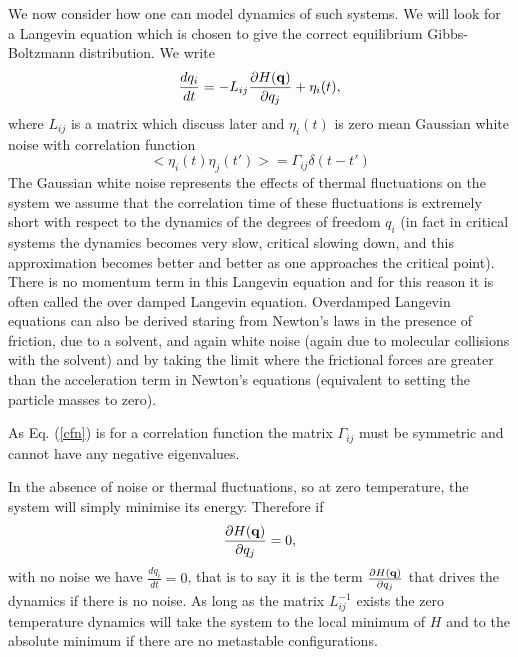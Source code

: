 We now consider how one can model dynamics of such systems. We will look for a Langevin equation which is chosen to give the correct equilibrium Gibbs-Boltzmann distribution. We write
\begin{equation}
    \frac{d q_i}{dt} = -L_{ij}\frac{\partial H({\bf q})}{ \partial q_j} + \eta_i(t),
\end{equation}
where $L_{ij}$ is a matrix which discuss later and $\eta_i(t)$ is zero mean Gaussian white noise  with correlation function 
\begin{equation}
    < \eta_i(t)\eta_j(t')> =  \Gamma_{ij} \delta(t-t')\label{cfn}
\end{equation}
The Gaussian white noise represents the effects of thermal fluctuations on the system we assume that the correlation time of these fluctuations is extremely short with respect to the dynamics of the degrees of freedom $q_i$ (in fact in critical systems the dynamics becomes very slow, critical slowing down, and this approximation becomes better and better as one approaches the critical point).  There is no momentum term in this Langevin equation and for this reason it is often called the over damped Langevin equation. Overdamped Langevin equations can also be derived staring from Newton's laws in the presence of friction, due to a solvent, and again white noise (again due to molecular collisions with the solvent) and by taking the limit where the frictional forces are greater than the acceleration term in Newton's equations (equivalent to setting the particle masses to zero).


As Eq. (\ref{cfn}) is for a correlation function the matrix $\Gamma_{ij}$ must be symmetric and cannot have any negative eigenvalues.

In the absence of noise or thermal fluctuations, so at zero temperature, the system will simply minimise its energy. Therefore if 
\begin{equation}
    \frac{\partial H({\bf q})}{ \partial q_j} =0, 
\end{equation}
with no noise we have $\frac{d q_i}{dt}=0$, that is to say it is the term $\frac{\partial H({\bf q})}{ \partial q_j}$ that drives the dynamics if there is no noise. As long as the matrix $L_{ij}^{-1}$ exists the zero temperature dynamics will take the system to the local minimum of $H$ and to the absolute minimum if there are no metastable configurations. 

